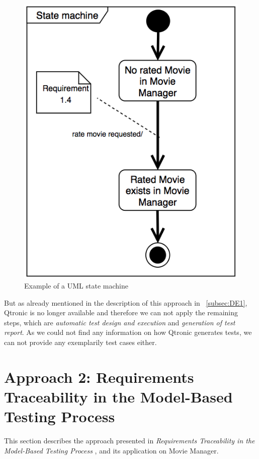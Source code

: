 \begin{figure} [H] 
\centering
\includegraphics[scale=0.3]{../images/Ap1-sm2} 
\caption{Example of a UML state machine}
\label{fig:Ap1-sm2}
\end{figure}

But as already mentioned in the description of this approach in ~\autoref{subsec:DE1}, Qtronic is no longer available and therefore we can not apply the remaining steps, which are \textit{automatic test design and execution} and \textit{generation of test report}. As we could not find any information on how Qtronic generates tests, we can not provide any exemplarily test cases either. 




\section{Approach 2: Requirements Traceability in the Model-Based Testing Process}
\label{sec:AP2}

This section describes the approach presented in \textit{Requirements Traceability in the Model-Based Testing Process} \cite{Paper2}, and its application on Movie Manager. 

